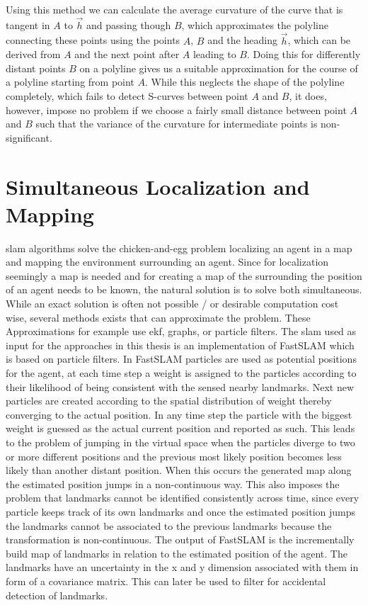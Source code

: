 
Using this method we can calculate the average curvature of the curve that is tangent in $A$ to $\vec h$ and passing though $B$, which approximates the polyline connecting these points using the points $A$, $B$ and the heading  $\vec h$, which can be derived from $A$ and the next point after $A$ leading to $B$.
Doing this for differently distant points $B$ on a polyline gives us a suitable approximation for the course of a polyline starting from point $A$. While this neglects the shape of the polyline completely, which fails to detect S-curves between point $A$ and $B$, it does, however, impose no problem if we choose a fairly small distance between point $A$ and $B$ such that the variance of the curvature for intermediate points is non-significant.


\section{Simultaneous Localization and Mapping}
\ac{slam} algorithms solve the chicken-and-egg problem localizing an agent in a map and mapping the environment surrounding an agent. Since for localization seemingly a map is needed and for creating a map of the surrounding the position of an agent needs to be known, the natural solution is to solve both simultaneous. While an exact solution is often not possible / or desirable computation cost wise, several methods exists that can approximate the problem. These Approximations for example use \ac{ekf}, graphs, or particle filters. The \ac{slam} used as input for the approaches in this thesis is an implementation of FastSLAM \cite{FastSLAM2002} which is based on particle filters. In FastSLAM particles are used as potential positions for the agent, at each time step a weight is assigned to the particles according to their likelihood of being consistent with the sensed nearby landmarks. Next new particles are created according to the spatial distribution of weight thereby converging to the actual position. In any time step the particle with the biggest weight is guessed as the actual current position and reported as such. This leads to the problem of jumping in the virtual space when the particles diverge to two or more different positions and the previous most likely position becomes less likely than another distant position. When this occurs the generated map along the estimated position jumps in a non-continuous way. This also imposes the problem that landmarks cannot be identified consistently across time, since every particle keeps track of its own landmarks and once the estimated position jumps the landmarks cannot be associated to the previous landmarks because the transformation is non-continuous. The output of FastSLAM is the incrementally build map of landmarks in relation to the estimated position of the agent. The landmarks have an uncertainty in the x and y dimension associated with them in form of a covariance matrix. This can later be used to filter for accidental detection of landmarks.

